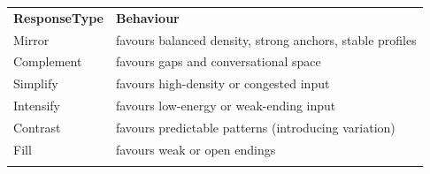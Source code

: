 {\def\LTcaptype{none} %
\begin{longtable}[]{@{}
  >{\raggedright\arraybackslash}p{}
  >{\raggedright\arraybackslash}p{}@{}}
\toprule\noalign{}
\begin{minipage}[b]{\linewidth}\centering
\textbf{ResponseType}
\end{minipage} & \begin{minipage}[b]{\linewidth}\centering
\textbf{Behaviour}
\end{minipage} \\
\begin{minipage}[b]{\linewidth}\raggedright
Mirror
\end{minipage} & \begin{minipage}[b]{\linewidth}\raggedright
favours balanced density, strong anchors, stable profiles
\end{minipage} \\
\begin{minipage}[b]{\linewidth}\raggedright
Complement
\end{minipage} & \begin{minipage}[b]{\linewidth}\raggedright
favours gaps and conversational space
\end{minipage} \\
\begin{minipage}[b]{\linewidth}\raggedright
Simplify
\end{minipage} & \begin{minipage}[b]{\linewidth}\raggedright
favours high-density or congested input
\end{minipage} \\
\begin{minipage}[b]{\linewidth}\raggedright
Intensify
\end{minipage} & \begin{minipage}[b]{\linewidth}\raggedright
favours low-energy or weak-ending input
\end{minipage} \\
\begin{minipage}[b]{\linewidth}\raggedright
Contrast
\end{minipage} & \begin{minipage}[b]{\linewidth}\raggedright
favours predictable patterns (introducing variation)
\end{minipage} \\
\begin{minipage}[b]{\linewidth}\raggedright
Fill
\end{minipage} & \begin{minipage}[b]{\linewidth}\raggedright
favours weak or open endings
\end{minipage} \\
\midrule\noalign{}
\endhead
\bottomrule\noalign{}
\endlastfoot
\end{longtable}
}

